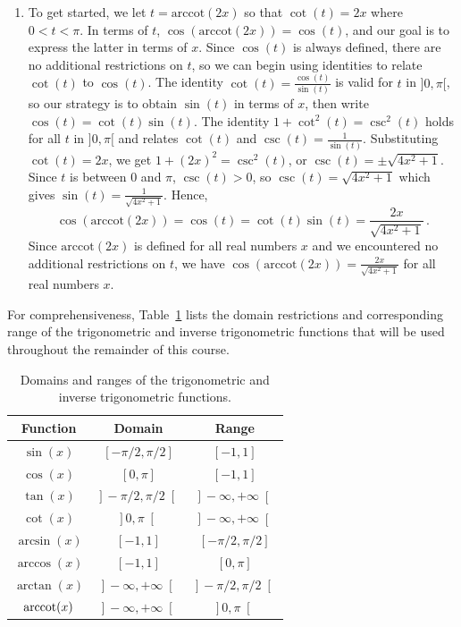 \begin{example}
\begin{enumerate}
\item  To get started, we let $t = \mbox{arccot}(2x)$ so that  $\cot(t) = 2x$ where $0 < t < \pi$.  In terms of $t$, $\cos(\mbox{arccot}(2x)) = \cos(t)$, and our goal is to express the latter in terms of $x$.   Since $\cos(t)$ is always defined, there are no additional restrictions on $t$, so we can begin using identities to relate $\cot(t)$ to $\cos(t)$.  The identity $\cot(t) = \frac{\cos(t)}{\sin(t)}$ is valid for $t$ in $]0,\pi[$, so our strategy is to obtain $\sin(t)$ in terms of $x$, then write $\cos(t) = \cot(t) \sin(t)$.   The identity $1 + \cot^{2}(t) = \csc^{2}(t)$ holds for all $t$ in $]0,\pi[$ and relates $\cot(t)$ and $\csc(t) = \frac{1}{\sin(t)}$.  Substituting $\cot(t) =2x$, we get  $1 + (2x)^2 = \csc^{2}(t)$, or $\csc(t) =  \pm \sqrt{4x^2+1}$. Since $t$ is between $0$ and $\pi$, $\csc(t) > 0$, so $\csc(t) =\sqrt{4x^2+1}$ which gives $\sin(t) = \frac{1}{\sqrt{4x^2+1}}$. Hence, 
$$
\cos(\mbox{arccot}(2x)) = \cos(t) = \cot(t) \sin(t) = \frac{2x}{\sqrt{4x^2+1}}\,.
$$
Since $\mbox{arccot}(2x)$ is defined for all real numbers $x$ and we encountered no additional restrictions on $t$, we have  $\cos\left(\mbox{arccot}(2x)\right) = \frac{2x}{\sqrt{4x^2+1}}$ for all real numbers $x$. 

\end{enumerate}
\end{example}
\fi


\ifcourse
\ifcalculus
For comprehensiveness, Table~\ref{tab_res_tri} lists the domain restrictions and corresponding range of the trigonometric and inverse trigonometric functions that will be used throughout the remainder of this course.


\begin{table}[h]
\begin{tabular}{c|cc}
Function & Domain & Range \\ \hline\hline
\rule{0pt}{12pt} $\sin (x)$ & $[-\pi/2, \pi/2]$ & $[-1,1]$\\
\rule{0pt}{12pt}$\cos (x)$ & $[0,\pi]$ & $[-1,1]$ \\
\rule{0pt}{12pt}$\tan (x)$ & $\left.\right]-\pi/2,\pi/2\left.\right[$ & $\left.\right]-\infty,+\infty\left.\right[$	\\
\rule{0pt}{12pt}$\cot (x)$ & $\left.\right]0,\pi\left.\right[$ & $\left.\right]-\infty,+\infty\left.\right[$\\[0.1cm] \hline
$\arcsin (x)$ & $[-1,1]$ & $[-\pi/2, \pi/2]$ \\[0.1cm]
$\arccos (x) $ & $[-1,1]$ & $[0,\pi]$\\[0.1cm]
$\arctan (x) $ & $\left.\right]-\infty,+\infty\left.\right[$ & $\left.\right]-\pi/2,\pi/2\left.\right[$\\[0.1cm]
$\operatorname{arccot} (x) $ &  $ \left.\right]-\infty,+\infty\left.\right[$ & $\left.\right]0,\pi\left.\right[$	\\[0.1cm]\hline\hline
\end{tabular}
\caption{Domains and ranges of the trigonometric and inverse trigonometric functions.}\label{tab_res_tri}
\end{table}
\fi 
\fi


